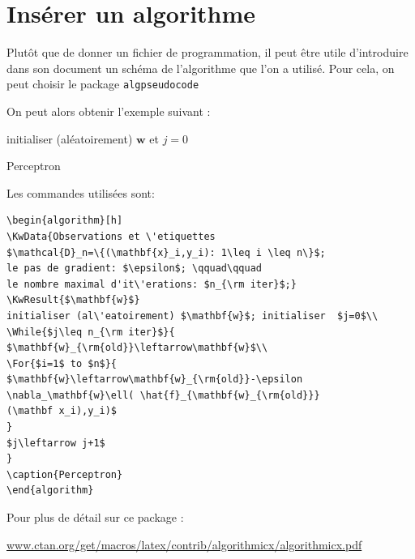 \section{Insérer un algorithme}
Plutôt que de donner un fichier de programmation, il peut être utile d'introduire dans son document
 un schéma de l'algorithme que l'on a utilisé. Pour cela, on peut choisir le package 
\lstinline+algpseudocode+

On peut alors obtenir  l'exemple suivant :\medskip 


\begin{algorithm}[h]
initialiser (aléatoirement) $\mathbf{w}$ et  $j=0$\\
\caption{Perceptron}
\end{algorithm}

Les commandes utilisées sont: 

\begin{lstlisting}
\begin{algorithm}[h]
\KwData{Observations et \'etiquettes 
$\mathcal{D}_n=\{(\mathbf{x}_i,y_i): 1\leq i \leq n\}$;
le pas de gradient: $\epsilon$; \qquad\qquad 
le nombre maximal d'it\'erations: $n_{\rm iter}$;}
\KwResult{$\mathbf{w}$}
initialiser (al\'eatoirement) $\mathbf{w}$; initialiser  $j=0$\\
\While{$j\leq n_{\rm iter}$}{
$\mathbf{w}_{\rm{old}}\leftarrow\mathbf{w}$\\
\For{$i=1$ to $n$}{
$\mathbf{w}\leftarrow\mathbf{w}_{\rm{old}}-\epsilon 
\nabla_\mathbf{w}\ell( \hat{f}_{\mathbf{w}_{\rm{old}}}
(\mathbf x_i),y_i)$
}
$j\leftarrow j+1$
}
\caption{Perceptron}
\end{algorithm}
\end{lstlisting}


\noindent Pour plus de détail sur ce package :

\noindent\url{www.ctan.org/get/macros/latex/contrib/algorithmicx/algorithmicx.pdf}

